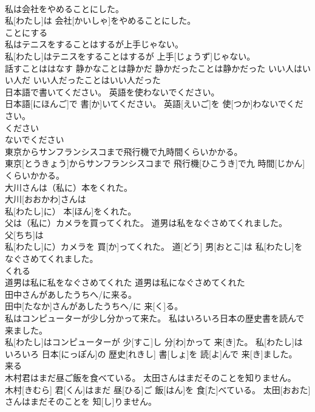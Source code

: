 \documentclass[8pt]{extreport}
\begin{document}
\begin{CJK}{UTF8}{min}
\\	私は会社をやめることにした。	
\\	私[わたし]は 会社[かいしゃ]をやめることにした。	
\\	ことにする	
\\	私はテニスをすることはするが上手じゃない。	
\\	私[わたし]はテニスをすることはするが 上手[じょうず]じゃない。	
\\	話すことははなす 静かなことは静かだ 静かだったことは静かだった いい人はいい人だ いい人だったことはいい人だった	
\\	日本語で書いてください。 英語を使わないでください。	
\\	日本語[にほんご]で 書[か]いてください。 英語[えいご]を 使[つか]わないでください。	
\\	ください 
\\	ないでください	
\\	東京からサンフランシスコまで飛行機で九時間くらいかかる。	
\\	東京[とうきょう]からサンフランシスコまで 飛行機[ひこうき]で九 時間[じかん]くらいかかる。	
\\	大川さんは（私に）本をくれた。	
\\	大川[おおかわ]さんは
\\	私[わたし]に） 本[ほん]をくれた。	
\\	父は（私に）カメラを買ってくれた。 道男は私をなぐさめてくれました。	
\\	父[ちち]は
\\	私[わたし]に）カメラを 買[か]ってくれた。 道[どう] 男[おとこ]は 私[わたし]をなぐさめてくれました。	
\\	くれる	
\\	道男は私に私をなぐさめてくれた 道男は私になぐさめてくれた
\\	田中さんがあしたうちへ/に来る。	
\\	田中[たなか]さんがあしたうちへ/に 来[く]る。	
\\	私はコンピューターが少し分かって来た。 私はいろいろ日本の歴史書を読んで来ました。	
\\	私[わたし]はコンピューターが 少[すこ]し 分[わ]かって 来[き]た。 私[わたし]はいろいろ 日本[にっぽん]の 歴史[れきし] 書[しょ]を 読[よ]んで 来[き]ました。	
\\	来る	
\\	木村君はまだ昼ご飯を食べている。 太田さんはまだそのことを知りません。	
\\	木村[きむら] 君[くん]はまだ 昼[ひる]ご 飯[はん]を 食[た]べている。 太田[おおた]さんはまだそのことを 知[し]りません。	

\end{CJK}
\end{document}
